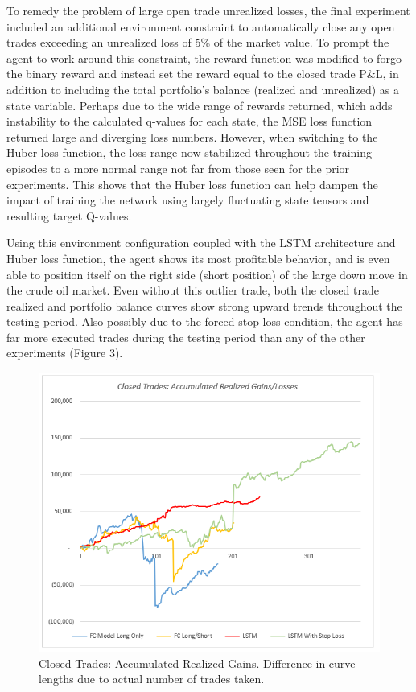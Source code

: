 \documentclass[10pt,twocolumn,letterpaper]{article}
\begin{document}
To remedy the problem of large open trade unrealized losses, the final experiment included an additional environment constraint to automatically close any open trades exceeding an unrealized loss of 5\% of the market value. To prompt the agent to work around this constraint, the reward function was modified to forgo the binary reward and instead set the reward equal to the closed trade P\&L, in addition to including the total portfolio's balance (realized and unrealized) as a state variable. Perhaps due to the wide range of rewards returned, which adds instability to the calculated q-values for each state, the MSE loss function returned large and diverging loss numbers. However, when switching to the Huber loss function, the loss range now stabilized throughout the training episodes to a more normal range not far from those seen for the prior experiments. This shows that the Huber loss function can help dampen the impact of training the network using largely fluctuating state tensors and resulting target Q-values.

Using this environment configuration coupled with the LSTM architecture and Huber loss function, the agent shows its most profitable behavior, and is even able to position itself on the right side (short position) of the large down move in the crude oil market. Even without this outlier trade, both the closed trade realized and portfolio balance curves show strong upward trends throughout the testing period. Also possibly due to the forced stop loss condition, the agent has far more executed trades during the testing period than any of the other experiments (Figure 3).

\begin{figure}[hbt!]
\begin{center}
     \includegraphics[scale=0.52]{closed_trades.PNG}
     \caption{Closed Trades: Accumulated Realized Gains. Difference in curve lengths due to actual number of trades taken.}
\end{center}
\end{figure}
\end{document}
